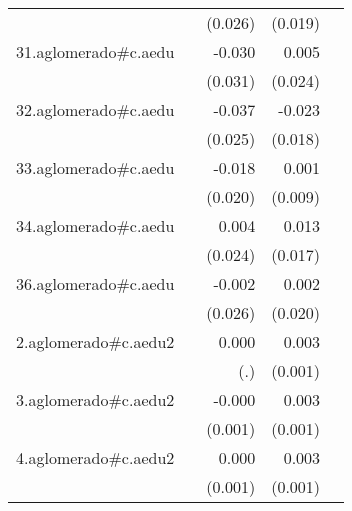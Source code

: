 {\begin{longtable}{l*{4}{D{.}{.}{-1}}}
            &                     &     (0.026)         &     (0.019)         &                     \\
\addlinespace
31.aglomerado#c.aedu&                     &      -0.030         &       0.005         &                     \\
            &                     &     (0.031)         &     (0.024)         &                     \\
\addlinespace
32.aglomerado#c.aedu&                     &      -0.037         &      -0.023         &                     \\
            &                     &     (0.025)         &     (0.018)         &                     \\
\addlinespace
33.aglomerado#c.aedu&                     &      -0.018         &       0.001         &                     \\
            &                     &     (0.020)         &     (0.009)         &                     \\
\addlinespace
34.aglomerado#c.aedu&                     &       0.004         &       0.013         &                     \\
            &                     &     (0.024)         &     (0.017)         &                     \\
\addlinespace
36.aglomerado#c.aedu&                     &      -0.002         &       0.002         &                     \\
            &                     &     (0.026)         &     (0.020)         &                     \\
\addlinespace
2.aglomerado#c.aedu2&                     &       0.000         &       0.003\sym{***}&                     \\
            &                     &         (.)         &     (0.001)         &                     \\
\addlinespace
3.aglomerado#c.aedu2&                     &      -0.000         &       0.003\sym{**} &                     \\
            &                     &     (0.001)         &     (0.001)         &                     \\
\addlinespace
4.aglomerado#c.aedu2&                     &       0.000         &       0.003\sym{***}&                     \\
            &                     &     (0.001)         &     (0.001)         &                     \\

\end{longtable}}
